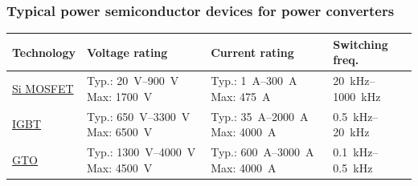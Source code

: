 \begin{frame}
	\frametitle{Typical power semiconductor devices for power converters}
	\begin{table}
		\centering
		\small
		\setlength{\tabcolsep}{4pt}
		\renewcommand{\arraystretch}{1.15}

		\begin{tabular}{p{2.5cm} p{3.6cm} p{3.5cm} p{2.8cm}}
			\toprule
			Technology                                                                      & Voltage rating & Current rating & Switching freq. \\
			\midrule

			\href{https://en.wikipedia.org/wiki/Power_MOSFET}{Si MOSFET}                    &
			Typ.: \SIrange{20}{900}{\volt}
			\newline Max: \SI{1700}{\volt}                                                  &
			Typ.: \SIrange{1}{300}{\ampere}
			\newline Max: \SI{475}{\ampere}                                                 &
			\SIrange{20}{1000}{\kilo\hertz}                                                                                                     \\

			\href{https://en.wikipedia.org/wiki/Insulated-gate_bipolar_transistor}{IGBT}    &
			Typ.: \SIrange{650}{3300}{\volt}
			\newline Max: \SI{6500}{\volt}                                                  &
			Typ.: \SIrange{35}{2000}{\ampere}
			\newline Max: \SI{4000}{\ampere}                                                &
			\SIrange{0.5}{20}{\kilo\hertz}                                                                                                      \\

			\href{https://en.wikipedia.org/wiki/Gate_turn-off_thyristor}{GTO}               &
			Typ.: \SIrange{1300}{4000}{\volt}
			\newline Max: \SI{4500}{\volt}                                                  &
			Typ.: \SIrange{600}{3000}{\ampere}
			\newline Max: \SI{4000}{\ampere}                                                &
			\SIrange{0.1}{0.5}{\kilo\hertz}                                                                                                     \\


\end{tabular}
\end{table}
\end{frame}
